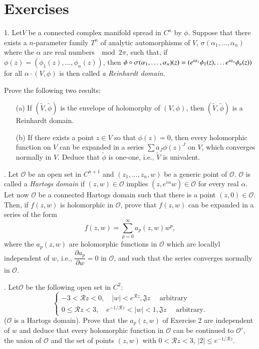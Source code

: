 \chapter*{Exercises}

1. Let\pageoriginale $V$ be a
connected complex manifold spread in 
$C^n$ by $\phi$. Suppose that there exists a $n$-parameter family
$T^n$ of analytic automorphisms of $V$, $\sigma (\alpha_1, \ldots,
\alpha_n)$ where the $\alpha$ are real numbers $\mod 2 \pi$, such
that, if $\phi(z) = (\phi_1(z), \ldots, \phi_n(z))$, then $\phi \circ
\sigma (\alpha_1 , \ldots, \alpha_n) (z) = (e^{i\alpha_1} \phi_1 (z),
\ldots\break e^{i\alpha_n} \phi_n (z))$ for all $\alpha \cdot (V, \phi)$ is
then called \textit{a Reinhardt domain}.

Prove the following two results:
\begin{itemize}
\item[(a)] If $(\tilde{V}, \tilde{\phi})$ is the envelope of
  holomorphy of $(V,\phi)$, then $(\tilde{V}, \tilde{\phi})$ is a
  Reinhardt domain.

\item[(b)] If there exists a point $z \in V$ so that $\phi(z) = 0$,
  then every holomorphic function on $V$ can be expanded in a series
  $\sum a_J \phi (z)^J$ on $V$, which converges normally in
  $V$. Deduce that $\tilde{\phi}$ is one-one, i.e., $\tilde{V}$ is
  univalent.
\end{itemize}


. Let $\mathscr{O}$ be an open set in $C^{n+1}$ and $(z_1, \ldots,
z_n, w)$ be a generic point of $\mathscr{O}$. $\mathscr{O}$ is called
a \textit{Hartogs domain} if $(z, w) \in \mathscr{O}$ implies $(z,
e^{i\alpha} w) \in \mathscr{O}$ for every real $\alpha$. Let now
$\mathscr{O}$ be a connected Hartogs domain such that there is a point
$(z, 0) \in \mathscr{O}$. Then, if $f(z,w)$ is holomorphic in
$\mathscr{O}$, prove that $f(z, w)$ can be expanded in a series of the
form
$$
f(z,w) = \sum\limits^\infty_{p=0} a_p (z,w) w^p, 
$$
where the $a_p(z, w)$ are holomorphic functions in $\mathscr{O}$ which
are locallyl independent of $w$, i.e., $\dfrac{\partial a_p}{\partial
  w} = 0$ in $\mathscr{O}$, and such that the series converges
normally in $\mathscr{O}$. 

. Let\pageoriginale $\mathscr{O}$ be the following open set in $C^2$:
$$
\begin{cases}
-3 <\mathscr{R} z < 0, \quad |w| < e^{\mathscr{R}z}, \mathfrak{J} z
\quad \text{ arbitrary}\\
0 \leq \mathscr{R} z < 3, \quad e^{-1/ \mathscr{R}z} < |w| < 1,
\mathfrak{J} z \quad \text{ arbitrary}. 
\end{cases}
$$
($\mathscr{O}$ is a Hartogs domain). Prove that the $a_p(z, w)$ of
Exercise 2 are independent of $w$ and deduce that every holomorphic
function in $\mathscr{O}$ can be continued to $\mathscr{O}'$, the
union of $\mathscr{O}$ and the set of points $(z,w)$ with $0<
\mathscr{R} z < 3$, $|2| \leq e^{-1/\mathscr{R}z}$. 

